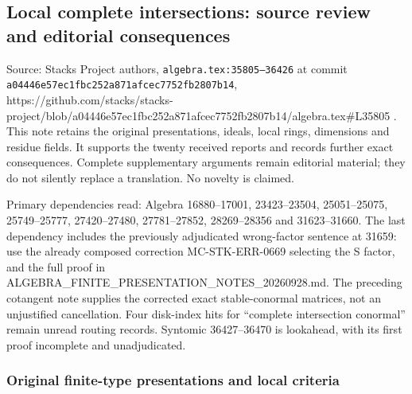 \subsection{Local complete intersections: source review and editorial consequences}\label{algebra-proof-045-local-complete-intersections-source-review-and-editorial-consequences}

Source: Stacks Project authors, \texttt{algebra.\AlgebraIdentifierBreak{}tex:\AlgebraIdentifierBreak{}35805–\AlgebraIdentifierBreak{}36426} at commit \texttt{a044\allowbreak{}46e5\allowbreak{}7ec1\allowbreak{}fbc2\allowbreak{}52a8\allowbreak{}71af\allowbreak{}cec7\allowbreak{}752f\allowbreak{}b280\allowbreak{}7b14}, https:\allowbreak{}/\allowbreak{}/\allowbreak{}github.\allowbreak{}com/\allowbreak{}stacks/\allowbreak{}stacks-\allowbreak{}project/\allowbreak{}blob/\allowbreak{}a04446e57ec1\allowbreak{}fbc252a871af\allowbreak{}cec7752fb280\allowbreak{}7b14/\allowbreak{}algebra.\allowbreak{}tex\#\allowbreak{}L35805 . This note retains the original presentations, ideals, local rings, dimensions and residue fields. It supports the twenty received reports and records further exact consequences. Complete supplementary arguments remain editorial material; they do not silently replace a translation. No novelty is claimed.

Primary dependencies read: Algebra 16880--17001, 23423--23504, 25051--25075, 25749--25777, 27420--27480, 27781--27852, 28269--28356 and 31623--31660. The last dependency includes the previously adjudicated wrong-factor sentence at 31659: use the already composed correction MC-\AlgebraIdentifierBreak{}STK-\AlgebraIdentifierBreak{}ERR-\AlgebraIdentifierBreak{}0669 selecting the S factor, and the full proof in ALGEBRA\_\allowbreak{}FINITE\_\allowbreak{}PRESENTATION\allowbreak{}\_\allowbreak{}NOTES\_\allowbreak{}20260928.\allowbreak{}md. The preceding cotangent note supplies the corrected exact stable-conormal matrices, not an unjustified cancellation. Four disk-index hits for ``complete intersection conormal'' remain unread routing records. Syntomic 36427--36470 is lookahead, with its first proof incomplete and unadjudicated.

\subsubsection{Original finite-type presentations and local criteria}\label{algebra-proof-045-original-finite-type-presentations-and-local-criteria}

